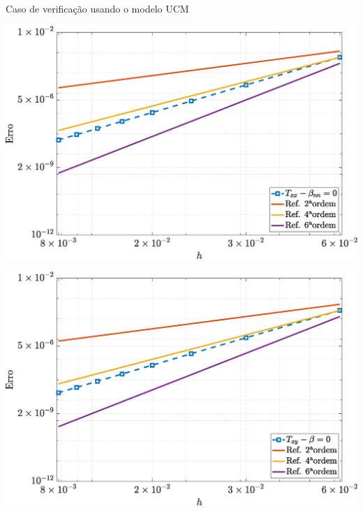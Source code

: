 \begin{frame}{Caso de verificação usando o modelo UCM}
    \centering
    \captionsetup{justification=centering}
    \label{fig:ucm_3}
    \begin{minipage}{0.325\textwidth}
        \centering
        \includegraphics[width=\textwidth]{Figures/UCM/NormErr_2nd_Re_100_Wi_1_epsilon_0_xi_0_alphaG_0_Dt_1e-06_at_0.05_tipsim_1_MMS_12_Txx.eps}
        \label{ucm_txx_Case11}
    \end{minipage}
    \hfill
    \begin{minipage}{0.325\textwidth}
        \centering
        \includegraphics[width=\textwidth]{Figures/UCM/NormErr_2nd_Re_100_Wi_1_epsilon_0_xi_0_alphaG_0_Dt_1e-06_at_0.05_tipsim_1_MMS_12_Txy.eps}

\end{minipage}
\end{frame}

